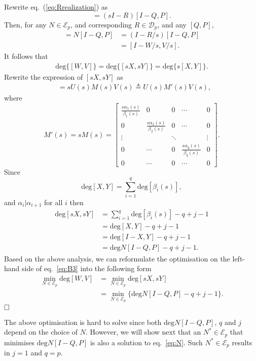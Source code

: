 \documentclass[twocolumn,12pt]{autart}
\theoremstyle{plain}
\newenvironment{proof}[1][Proof]{\begin{trivlist} \item[\hskip \labelsep {\bfseries #1}]}{\end{trivlist}}
\begin{document}
\begin{proof}
Rewrite eq.~(\ref{eq:Rrealization}) as
\begin{equation}
[sI-W,V]= (s{I}-{R})[I-{Q},{P}].
\end{equation}
Then, for any $N\in\mathcal{E}_p$, and corresponding $R\in\mathcal{D}_p$, and any $[Q,P]$,
\begin{align*}
[I-X,Y]=N[I-Q,P] & =(I-R/s)[I-Q,P]\\  & =[I-W/s,V/s]. 
\end{align*}
It follows that 
\begin{align*}
\text{deg}\{[W,V]\}=\text{deg}\{[sX,sY]\}=\text{deg}\{s[X,Y]\}.
\end{align*}
Rewrite the expression of $[sX,sY]$ as
\begin{align*}
[sX,sY]&=sU(s)M(s)V(s)
\triangleq U(s)M'(s)V(s),
\end{align*}
where $$M'(s)=sM(s)=\begin{bmatrix} 
\frac{s\alpha_{1}(s)}{\beta_{1}(s)} & 0 & 0 & \cdots  & 0 \\
0 & \frac{s\alpha_{2}(s)}{\beta_{2}(s)} & 0 & \cdots & 0\\
\vdots &  & \ddots & & \vdots\\
0 & \cdots & 0 & \frac{s\alpha_{q}(s)}{\beta_{q}(s)} & 0 \\
0 & \cdots & 0 &  \cdots & 0 
\end{bmatrix}.$$ 
Since 
$$\text{deg}[X,Y]=\sum_{i=1}^q\text{deg}[\beta_i(s)],$$
and $\alpha_i|\alpha_{i+1}$ for all $i$
then
\begin{align}
\text{deg}[sX,sY]&=\sum_{i=1}^q\text{deg}[\beta_i(s)]-q+j-1\nonumber\\
&=\text{deg}[X,Y]-q+j-1\nonumber\\
&=\text{deg}[I-X,Y]-q+j-1\nonumber \\
&=\text{deg}N[I-Q,P]-q+j-1. \label{eq:jj}
\end{align}
Based on the above analysis, we can reformulate the optimisation on the left-hand side of eq.~\eqref{eq:B3} into the following form
\begin{align}
\min_{N\in\mathcal{E}_p} \text{deg}[W,V]&=\min_{N\in\mathcal{E}_p} \text{deg}[sX,sY]\nonumber\\
&=\min_{N\in\mathcal{E}_p}\{\text{deg}N[I-Q,P]-q+j-1\}.
\label{eq:N}
\end{align}
$\hfill \square$
\end{proof}

The above optimisation is hard to solve since both $\text{deg}N[I-Q,P]$, $q$ and $j$ depend on the choice of $N$. However, we will show next that an $N^*\in\mathcal{E}_p$ that minimises $\text{deg}N[I-Q,P]$ is also a solution to eq.~\eqref{eq:N}. Such $N^*\in\mathcal{E}_p$ results in $j=1$ and $q=p$. 
\end{document}
